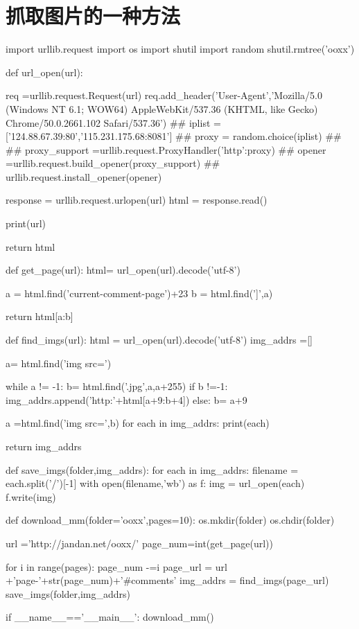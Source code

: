 \documentclass[a4paper,10pt]{ctexart}
\begin{document}
\section{抓取图片的一种方法}
\begin{python}

import urllib.request
import os
import shutil
import random
shutil.rmtree('ooxx')

def url_open(url):

      req =urllib.request.Request(url)
      req.add_header('User-Agent','Mozilla/5.0 (Windows NT 6.1; WOW64) AppleWebKit/537.36 (KHTML, like Gecko) Chrome/50.0.2661.102 Safari/537.36')
##      iplist =['124.88.67.39:80','115.231.175.68:8081']
##      proxy = random.choice(iplist)
##
##      proxy_support =urllib.request.ProxyHandler({'http':proxy})
##      opener =urllib.request.build_opener(proxy_support)
##      urllib.request.install_opener(opener)

      response = urllib.request.urlopen(url)
      html = response.read()

      print(url)

      return html



def get_page(url):
      html= url_open(url).decode('utf-8')

      a = html.find('current-comment-page')+23
      b = html.find(']',a)

      return html[a:b]


def find_imgs(url):
      html = url_open(url).decode('utf-8')
      img_addrs =[]

      a= html.find('img src=')

      while a != -1:
            b= html.find('.jpg',a,a+255)
            if b !=-1:
                  img_addrs.append('http:'+html[a+9:b+4])
            else:
                  b= a+9

            a =html.find('img src=',b)
      for each in img_addrs:
            print(each)


      return img_addrs



def save_imgs(folder,img_addrs):
      for each in img_addrs:
            filename = each.split('/')[-1]
            with open(filename,'wb') as f:
                  img = url_open(each)
                  f.write(img)




def download_mm(folder='ooxx',pages=10):
      os.mkdir(folder)
      os.chdir(folder)

      url ='http://jandan.net/ooxx/'
      page_num=int(get_page(url))

      for i in range(pages):
            page_num -=i
            page_url = url +'page-'+str(page_num)+'#comments'
            img_addrs = find_imgs(page_url)
            save_imgs(folder,img_addrs)


if __name__=='__main__':
      download_mm()

\end{python}
\end{document}
